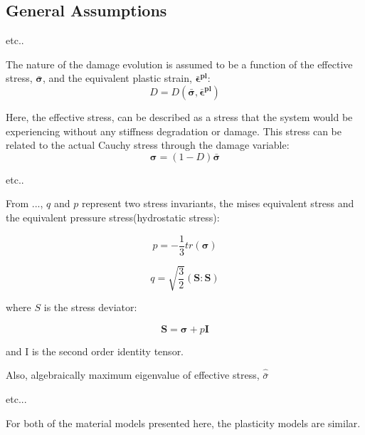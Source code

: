 \subsection{General Assumptions}
etc..

The nature of the damage evolution is assumed to be a function of the effective stress, $\boldsymbol{\bar{\sigma}}$, and the equivalent plastic strain, $\boldsymbol{\bar{\epsilon}^{pl}}$:
\begin{equation}
D=D(\boldsymbol{\bar{\sigma}},\boldsymbol{\bar{\epsilon}^{pl}})\label{eqn:const8}
\end{equation}



Here, the effective stress,  can be described as a stress that the system would be experiencing without any stiffness degradation or damage. This stress can be related to the actual Cauchy stress through the damage variable: 
\begin{equation}
\boldsymbol{\sigma}=(1-D)\boldsymbol{\bar{\sigma}}\label{eqn:const7}
\end{equation}

etc..

From ..., $q$ and $p$ represent two stress invariants, the mises
equivalent stress and the equivalent pressure stress(hydrostatic stress):

\begin{equation}
p=-\frac{1}{3}tr\left(\boldsymbol{\sigma}\right)\label{eqn:druc3}
\end{equation}


\begin{equation}
q=\sqrt{\frac{3}{2}}\left(\mathbf{S}:\mathbf{S}\right)\label{eqn:druc4}
\end{equation}


where $S$ is the stress deviator:

\begin{equation}
\mathbf{S}=\boldsymbol{\sigma}+p\mathbf{I}\label{eqn:druc4-1}
\end{equation}


and I is the second order identity tensor. 


Also, algebraically maximum eigenvalue of effective stress, $\hat{\bar{\sigma}}$


etc...

For both of the material models presented here, the plasticity models are similar. 